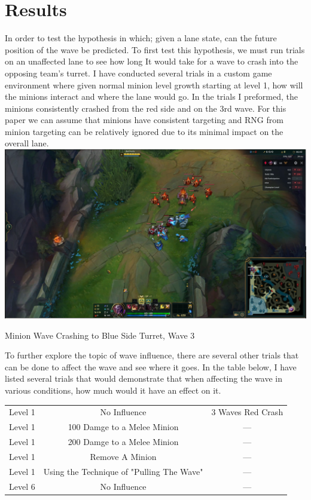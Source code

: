 \documentclass{article}
\begin{document}
\section{Results}
\begin{table}[h]
In order to test the hypothesis in which; given a lane state, can the future position of the wave be predicted. To first test this hypothesis, we must run trials on an unaffected lane to see how long It would take for a wave to crash into the opposing team’s turret. I have conducted several trials in a custom game environment where given normal minion level growth starting at level 1, how will the minions interact and where the lane would go. In the trials I preformed, the minions consistently crashed from the red side and on the 3rd wave. For this paper we can assume that minions have consistent targeting and RNG from minion targeting can be relatively ignored due to its minimal impact on the overall lane. 
\includegraphics[width=\textwidth]{Crash.PNG}
\caption[Minion Wave Crashing to Blue Side Turret]{Minion Wave Crashing to Blue Side Turret, Wave 3}
\end{table}
To further explore the topic of wave influence, there are several other trials that can be done to affect the wave and see where it goes. In the table below, I have listed several trials that would demonstrate that when affecting the wave in various conditions, how much would it have an effect on it.
\begin{center}
\begin{tabular}{ c c c}
  Level 1 & No Influence & 3 Waves Red Crash\\ 
  Level 1 & 100 Damge to  a Melee Minion & ---\\  
  Level 1 & 200 Damge to  a Melee Minion & ---\\  
  Level 1 & Remove A Minion & ---\\  
  Level 1 & Using the Technique of "Pulling The Wave"  & ---\\
  Level 6 & No Influence  & ---
\end{tabular}
\newpage
\end{center}
\end{document}
